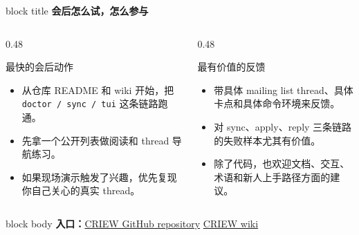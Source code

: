 \documentclass[aspectratio=169,professionalfonts]{beamer}
\newcommand{\sectiontitle}[1]{
  \begin{beamercolorbox}[wd=\linewidth,sep=0.7em,rounded=true]{block title}
    \usebeamerfont*{frametitle}\Large\bfseries #1
  \end{beamercolorbox}
  \vspace{0.4em}
}
\begin{document}
\begin{frame}
  \sectiontitle{会后怎么试，怎么参与}
  \small
  \begin{columns}[T,totalwidth=\textwidth]
    \begin{column}{0.48\textwidth}
      \begin{exampleblock}{最快的会后动作}
        \begin{itemize}
          \item 从仓库 README 和 wiki 开始，把 \texttt{doctor / sync / tui} 这条链路跑通。
          \item 先拿一个公开列表做阅读和 thread 导航练习。
          \item 如果现场演示触发了兴趣，优先复现你自己关心的真实 thread。
        \end{itemize}
      \end{exampleblock}
    \end{column}
    \begin{column}{0.48\textwidth}
      \begin{alertblock}{最有价值的反馈}
        \begin{itemize}
          \item 带具体 mailing list thread、具体卡点和具体命令环境来反馈。
          \item 对 sync、apply、reply 三条链路的失败样本尤其有价值。
          \item 除了代码，也欢迎文档、交互、术语和新人上手路径方面的建议。
        \end{itemize}
      \end{alertblock}
    \end{column}
  \end{columns}
  \vspace{0.5em}
  \begin{beamercolorbox}[wd=\linewidth,sep=0.75em,rounded=true]{block body}
    \textbf{入口：}\href{https://github.com/ChenMiaoi/CRIEW}{CRIEW GitHub repository} \quad
    \href{https://github.com/ChenMiaoi/CRIEW/wiki}{CRIEW wiki}
  \end{beamercolorbox}
\end{frame}
\end{document}
